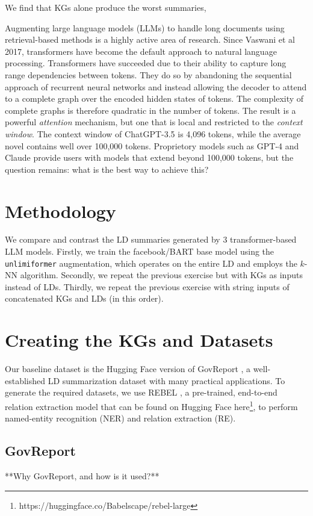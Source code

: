 \documentclass[12pt]{article}
\begin{document}
We find that KGs
alone produce the worst summaries, 


Augmenting large language models (LLMs) to handle long documents using
retrieval-based methods is a highly active area of research. Since Vaswani et
al 2017, transformers have become the default approach to natural language
processing. Transformers have succeeded due to their ability to capture long
range dependencies between tokens. They do so by abandoning the sequential
approach of recurrent neural networks and instead allowing the decoder to
attend to a complete graph over the encoded hidden states of tokens. The
complexity of complete graphs is therefore quadratic in the number of tokens.
The result is a powerful \emph{attention} mechanism, but one that is local and
restricted to the \emph{context window}. The context window of ChatGPT-3.5 is
4,096 tokens, while the average novel contains well over 100,000 tokens.
Proprietory models such as GPT-4 and Claude provide users with models that
extend beyond 100,000 tokens, but the question remains: what is the best way to
achieve this?



\section{Methodology}
We compare and contrast the LD summaries generated by 3 transformer-based LLM
models. Firstly, we train the facebook/BART base model using the
\texttt{unlimiformer} augmentation, which operates on the entire LD and employs
the $k$-NN algorithm. Secondly, we repeat the previous exercise but with KGs as
inputs instead of LDs. Thirdly, we repeat the previous exercise with string
inputs of concatenated KGs and LDs (in this order).

\section{Creating the KGs and Datasets}
Our baseline dataset is the Hugging Face version of GovReport
\cite{huang2021efficient}, a well-established LD summarization dataset with
many practical applications. To generate the required datasets, we use REBEL
\cite{huguet2021rebel}, a pre-trained, end-to-end relation extraction model
that can be found on Hugging Face
here\footnote{https://huggingface.co/Babelscape/rebel-large}, to perform
named-entity recognition (NER) and relation extraction (RE).

\subsection*{GovReport}
**Why GovReport, and how is it used?**
\end{document}
